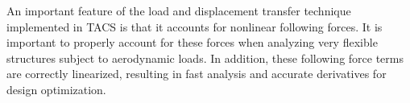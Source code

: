 \documentclass[]{aiaa-tc}
\begin{document}
An important feature of the load and displacement transfer technique
implemented in TACS is that it accounts for nonlinear following
forces.  It is important to properly account for these forces when
analyzing very flexible structures subject to aerodynamic loads. In
addition, these following force terms are correctly linearized,
resulting in fast analysis and accurate derivatives for design
optimization.





\end{document}
